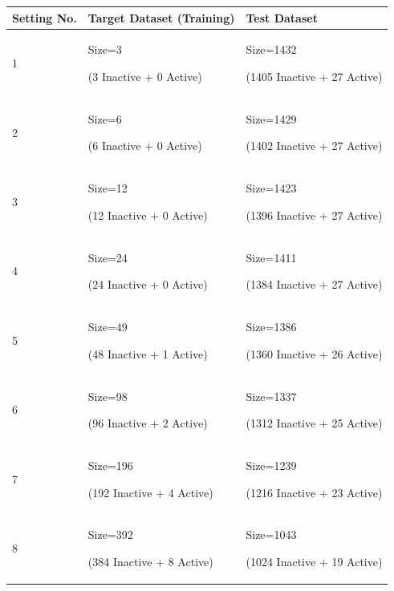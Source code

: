 \documentclass[a4paper,12pt, english]{article}
\begin{document}
\begin{itemize}
\begin{center}
    \begin{tabular}{ | l | l | l | }
    \hline
      	\textbf{Setting No.} & \textbf{Target Dataset (Training)} & \textbf{Test Dataset} \\ \hline
      	1 & Size=3 \begin{scriptsize}(3 Inactive + 0 Active)\end{scriptsize} & Size=1432 \begin{scriptsize}(1405 Inactive + 27 Active)\end{scriptsize}\\ \hline
	2 & Size=6 \begin{scriptsize}(6 Inactive + 0 Active)\end{scriptsize} & Size=1429 \begin{scriptsize}(1402 Inactive + 27 Active)\end{scriptsize}\\ \hline
	3 & Size=12 \begin{scriptsize}(12 Inactive + 0 Active)\end{scriptsize} & Size=1423 \begin{scriptsize}(1396 Inactive + 27 Active)\end{scriptsize}\\ \hline
	4 & Size=24 \begin{scriptsize}(24 Inactive + 0 Active)\end{scriptsize} & Size=1411 \begin{scriptsize}(1384 Inactive + 27 Active)\end{scriptsize}\\ \hline
	5 & Size=49 \begin{scriptsize}(48 Inactive + 1 Active)\end{scriptsize} & Size=1386 \begin{scriptsize}(1360 Inactive + 26 Active)\end{scriptsize}\\ \hline
	6 & Size=98 \begin{scriptsize}(96 Inactive + 2 Active)\end{scriptsize} & Size=1337 \begin{scriptsize}(1312 Inactive + 25 Active)\end{scriptsize}\\ \hline
	7 & Size=196 \begin{scriptsize}(192 Inactive + 4 Active)\end{scriptsize} & Size=1239 \begin{scriptsize}(1216 Inactive + 23 Active)\end{scriptsize}\\ \hline
	8 & Size=392 \begin{scriptsize}(384 Inactive + 8 Active)\end{scriptsize} & Size=1043 \begin{scriptsize}(1024 Inactive + 19 Active)\end{scriptsize}\\ \hline
    \end{tabular}       
\end{center}

\end{itemize}  
\end{document}
